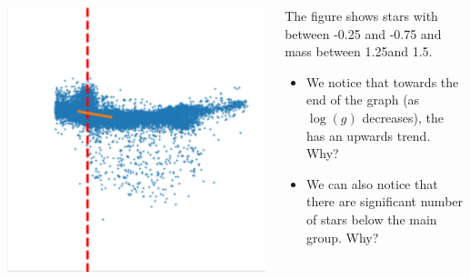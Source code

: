 \begin{frame}
\begin{columns}
   \begin{column}{0.5\textwidth}
        \centering
        \includegraphics[width=.7\columnwidth]{Figures/Fe(-0.25,-0.75)Mass(1.25,1.5).png}
   \end{column}
\begin{column}{0.5\textwidth}
    The figure shows stars with  between -0.25 and -0.75 and mass between 1.25\SM and 1.5\SM.
    \begin{itemize}
        \item We notice that towards the end of the graph (as $\log(g)$ decreases), the \CN has an upwards trend. Why?
        \item We can also notice that there are significant number of stars below the main group. Why?
    \end{itemize}
\end{column}
\end{columns}
\end{frame}


